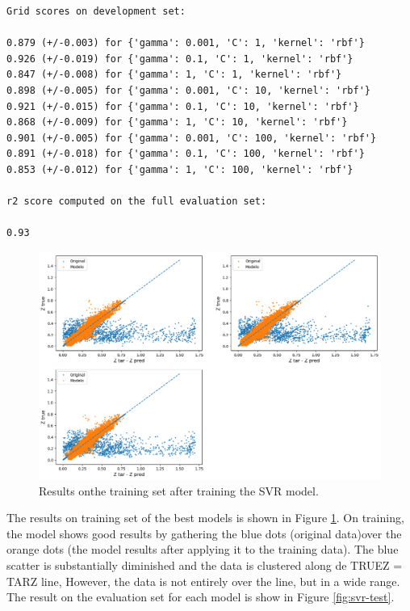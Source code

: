 \begin{verbatim}
Grid scores on development set:

0.879 (+/-0.003) for {'gamma': 0.001, 'C': 1, 'kernel': 'rbf'}
0.926 (+/-0.019) for {'gamma': 0.1, 'C': 1, 'kernel': 'rbf'}
0.847 (+/-0.008) for {'gamma': 1, 'C': 1, 'kernel': 'rbf'}
0.898 (+/-0.005) for {'gamma': 0.001, 'C': 10, 'kernel': 'rbf'}
0.921 (+/-0.015) for {'gamma': 0.1, 'C': 10, 'kernel': 'rbf'}
0.868 (+/-0.009) for {'gamma': 1, 'C': 10, 'kernel': 'rbf'}
0.901 (+/-0.005) for {'gamma': 0.001, 'C': 100, 'kernel': 'rbf'}
0.891 (+/-0.018) for {'gamma': 0.1, 'C': 100, 'kernel': 'rbf'}
0.853 (+/-0.012) for {'gamma': 1, 'C': 100, 'kernel': 'rbf'}

r2 score computed on the full evaluation set:

0.93

\end{verbatim}
\begin{figure}[th!]
	\centering
	\includegraphics[width=1.0\linewidth]{TeX_files/Imagenes/svr-train}
	\caption{Results onthe training set after training the SVR model.}
	\label{fig:svr-train}
\end{figure}
The results on training set of the best models is shown in Figure \ref{fig:svr-train}. On training, the model shows good results by gathering the blue dots (original data)over the orange dots (the model results after applying it to the training data). The blue scatter is substantially diminished and the data is clustered along de TRUEZ = TARZ line, However, the data is not entirely over the line, but in a wide range. The result on the evaluation set for each model is show in Figure \ref{fig:svr-test}. 

